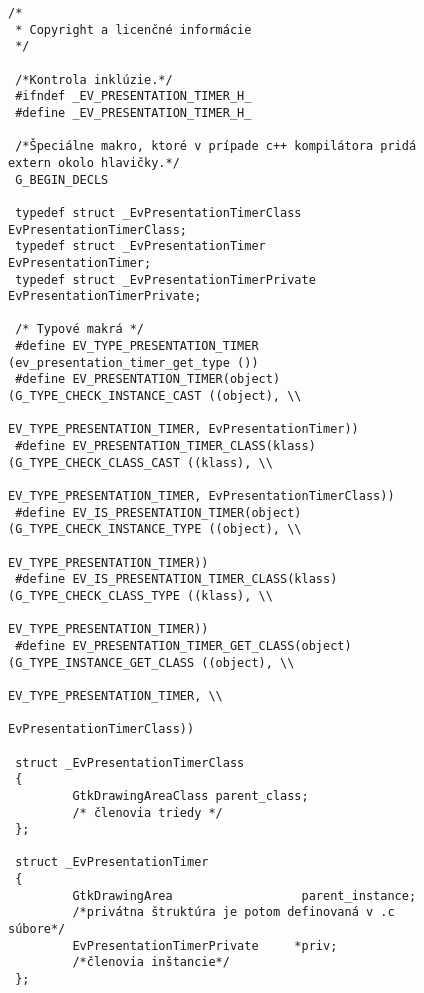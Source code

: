\documentclass[12pt,oneside,final]{fithesis2}
\begin{document}
\begin{figure}[h]
\begin{tiny}
\begin{verbatim}
/*
 * Copyright a licenčné informácie
 */
 
 /*Kontrola inklúzie.*/
 #ifndef _EV_PRESENTATION_TIMER_H_
 #define _EV_PRESENTATION_TIMER_H_
 
 /*Špeciálne makro, ktoré v prípade c++ kompilátora pridá extern okolo hlavičky.*/
 G_BEGIN_DECLS
 
 typedef struct _EvPresentationTimerClass        EvPresentationTimerClass;
 typedef struct _EvPresentationTimer             EvPresentationTimer;
 typedef struct _EvPresentationTimerPrivate      EvPresentationTimerPrivate;
 
 /* Typové makrá */
 #define EV_TYPE_PRESENTATION_TIMER              (ev_presentation_timer_get_type ())
 #define EV_PRESENTATION_TIMER(object)           (G_TYPE_CHECK_INSTANCE_CAST ((object), \\
                                                  EV_TYPE_PRESENTATION_TIMER, EvPresentationTimer))
 #define EV_PRESENTATION_TIMER_CLASS(klass)      (G_TYPE_CHECK_CLASS_CAST ((klass), \\
                                                  EV_TYPE_PRESENTATION_TIMER, EvPresentationTimerClass))
 #define EV_IS_PRESENTATION_TIMER(object)        (G_TYPE_CHECK_INSTANCE_TYPE ((object), \\
                                                  EV_TYPE_PRESENTATION_TIMER))
 #define EV_IS_PRESENTATION_TIMER_CLASS(klass)   (G_TYPE_CHECK_CLASS_TYPE ((klass), \\
                                                  EV_TYPE_PRESENTATION_TIMER))
 #define EV_PRESENTATION_TIMER_GET_CLASS(object) (G_TYPE_INSTANCE_GET_CLASS ((object), \\
                                                  EV_TYPE_PRESENTATION_TIMER, \\
                                                  EvPresentationTimerClass))
 
 struct _EvPresentationTimerClass
 {
         GtkDrawingAreaClass parent_class;
         /* členovia triedy */
 };
 
 struct _EvPresentationTimer
 {
         GtkDrawingArea                  parent_instance;
         /*privátna štruktúra je potom definovaná v .c súbore*/
         EvPresentationTimerPrivate     *priv;
         /*členovia inštancie*/
 };
 

\end{verbatim}
\end{tiny}
\end{figure}
\end{document}
